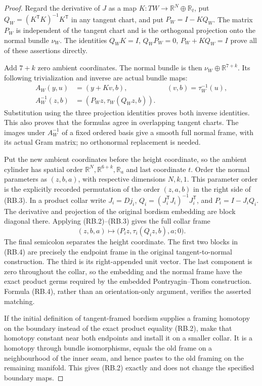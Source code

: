 \begin{proof}
Regard the derivative of $J$ as a map
$K:TW\to\mathbb R^N\oplus\mathbb R_t$, put
$Q_W=(K^{\mathsf T}K)^{-1}K^{\mathsf T}$ in any tangent chart, and put
$P_W=I-KQ_W$.  The matrix $P_W$ is independent of the tangent chart
and is the orthogonal projection onto the normal bundle $\nu_W$.
The identities $Q_WK=I$, $Q_WP_W=0$, $P_W+KQ_W=I$ prove all of these
assertions directly.

Add $7+k$ zero ambient coordinates.  The normal bundle is then
$\nu_W\oplus\mathbb R^{7+k}$.  Its following trivialization and
inverse are actual bundle maps:
\[
 \begin{aligned}
 A_W(y,u)&=(y+Kv,b), &&(v,b)=\tau_W^{-1}(u),\\
 A_W^{-1}(z,b)&=(P_Wz,\tau_W(Q_Wz,b)).
 \end{aligned}
 \tag{RB.3}
\]
Substitution using the three projection identities proves both inverse
identities.  This also proves that the formulas agree in overlapping
tangent charts.  The images under $A_W^{-1}$ of a fixed ordered basis
give a smooth full normal frame, with its actual Gram matrix; no
orthonormal replacement is needed.

Put the new ambient coordinates before the height coordinate, so the
ambient cylinder has spatial order
$\mathbb R^N,\mathbb R^{6+k},\mathbb R_a$ and last coordinate $t$.
Order the normal parameters as $(z,b,a)$, with respective dimensions
$N,k,1$.  This parameter order is the explicitly recorded permutation
of the order $(z,a,b)$ in the right side of (RB.3).  In a product collar
write $J_i=Dj_i$, $Q_i=(J_i^{\mathsf T}J_i)^{-1}J_i^{\mathsf T}$,
and $P_i=I-J_iQ_i$.  The derivative and projection of the original
bordism embedding are block diagonal there.  Applying (RB.2)--(RB.3)
gives the full collar frame
\[
 (z,b,a)\longmapsto
 \bigl(P_i z,\tau_i(Q_i z,b),a;0\bigr).
 \tag{RB.4}
\]
The final semicolon separates the height coordinate.  The first two
blocks in (RB.4) are precisely the endpoint frame in the original
tangent-to-normal construction.  The third is its right-appended unit
vector.  The last component is zero throughout the collar, so the
embedding and the normal frame have the exact product germs required
by the embedded Pontryagin--Thom construction.  Formula (RB.4), rather
than an orientation-only argument, verifies the asserted matching.

If the initial definition of tangent-framed bordism supplies a framing
homotopy on the boundary instead of the exact product equality
(RB.2), make that homotopy constant near both endpoints and install it
on a smaller collar.  It is a homotopy through bundle isomorphisms,
equals the old frame on a neighbourhood of the inner seam, and hence
pastes to the old framing on the remaining manifold.  This gives
(RB.2) exactly and does not change the specified boundary maps.
\end{proof}

